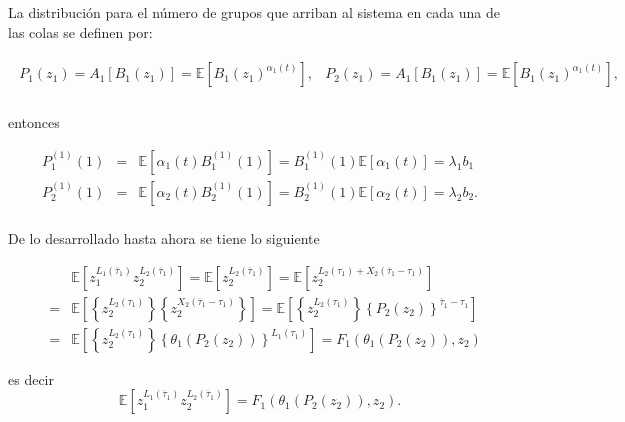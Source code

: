 \documentclass{article}
\newcommand{\esp}{\mathbb{E}}
\begin{document}
La distribuci\'on para el n\'umero de grupos que arriban al sistema en cada una de las colas se definen por:

\begin{eqnarray*}
\begin{array}{cc}
P_{1}\left(z_{1}\right)=A_{1}\left[B_{1}\left(z_{1}\right)\right]=\esp\left[B_{1}\left(z_{1}\right)^{\alpha_{1}\left(t\right)}\right],& P_{2}\left(z_{1}\right)=A_{1}\left[B_{1}\left(z_{1}\right)\right]=\esp\left[B_{1}\left(z_{1}\right)^{\alpha_{1}\left(t\right)}\right],\\
\end{array}
\end{eqnarray*}

entonces

\begin{eqnarray*}
P_{1}^{(1)}\left(1\right)&=&\esp\left[\alpha_{1}\left(t\right)B_{1}^{(1)}\left(1\right)\right]=B_{1}^{(1)}\left(1\right)\esp\left[\alpha_{1}\left(t\right)\right]=\lambda_{1}b_{1}\\
P_{2}^{(1)}\left(1\right)&=&\esp\left[\alpha_{2}\left(t\right)B_{2}^{(1)}\left(1\right)\right]=B_{2}^{(1)}\left(1\right)\esp\left[\alpha_{2}\left(t\right)\right]=\lambda_{2}b_{2}.\\
\end{eqnarray*}

De lo desarrollado hasta ahora se tiene lo siguiente

\begin{eqnarray*}
&&\esp\left[z_{1}^{L_{1}\left(\overline{\tau}_{1}\right)}z_{2}^{L_{2}\left(\overline{\tau}_{1}\right)}\right]=\esp\left[z_{2}^{L_{2}\left(\overline{\tau}_{1}\right)}\right]=\esp\left[z_{2}^{L_{2}\left(\tau_{1}\right)+X_{2}\left(\overline{\tau}_{1}-\tau_{1}\right)}\right]\\
&=&\esp\left[\left\{z_{2}^{L_{2}\left(\tau_{1}\right)}\right\}\left\{z_{2}^{X_{2}\left(\overline{\tau}_{1}-\tau_{1}\right)}\right\}\right]=\esp\left[\left\{z_{2}^{L_{2}\left(\tau_{1}\right)}\right\}\left\{P_{2}\left(z_{2}\right)\right\}^{\overline{\tau}_{1}-\tau_{1}}\right]\\
&=&\esp\left[\left\{z_{2}^{L_{2}\left(\tau_{1}\right)}\right\}\left\{\theta_{1}\left(P_{2}\left(z_{2}\right)\right)\right\}^{L_{1}\left(\tau_{1}\right)}\right]=F_{1}\left(\theta_{1}\left(P_{2}\left(z_{2}\right)\right),z_{2}\right)
\end{eqnarray*}

es decir 
\begin{equation}\label{Eq.base.F1}
\esp\left[z_{1}^{L_{1}\left(\overline{\tau}_{1}\right)}z_{2}^{L_{2}\left(\overline{\tau}_{1}\right)}\right]=F_{1}\left(\theta_{1}\left(P_{2}\left(z_{2}\right)\right),z_{2}\right).
\end{equation}
\end{document}
